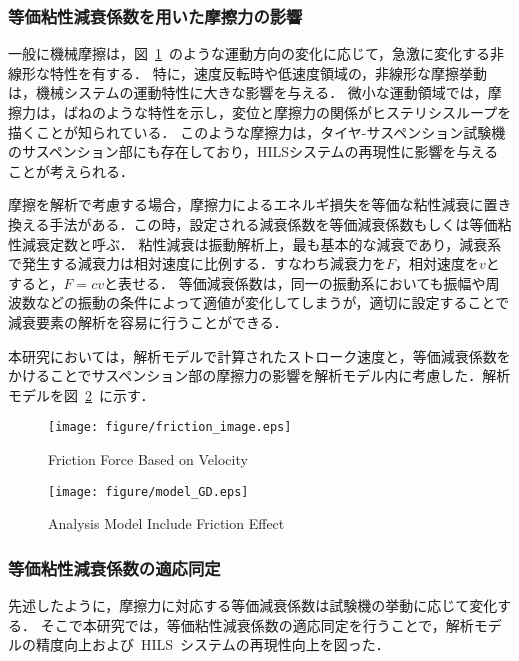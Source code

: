 \documentclass[a4paper,12pt]{article_vdlab_sotsuron}
\begin{document}
\subsubsection{等価粘性減衰係数を用いた摩擦力の影響}
一般に機械摩擦は，図~\ref{fig:Fric}~のような運動方向の変化に応じて，急激に変化する非線形な特性を有する．
特に，速度反転時や低速度領域の，非線形な摩擦挙動は，機械システムの運動特性に大きな影響を与える．
微小な運動領域では，摩擦力は，ばねのような特性を示し，変位と摩擦力の関係がヒステリシスループを描くことが知られている\cite{hys1}．
このような摩擦力は，タイヤ-サスペンション試験機のサスペンション部にも存在しており，HILSシステムの再現性に影響を与えることが考えられる．
\par
摩擦を解析で考慮する場合，摩擦力によるエネルギ損失を等価な粘性減衰に置き換える手法がある．この時，設定される減衰係数を等価減衰係数もしくは等価粘性減衰定数と呼ぶ．
粘性減衰は振動解析上，最も基本的な減衰であり，減衰系で発生する減衰力は相対速度に比例する．すなわち減衰力を$F$，相対速度を$v$とすると，$F=cv$と表せる．
等価減衰係数は，同一の振動系においても振幅や周波数などの振動の条件によって適値が変化してしまうが，適切に設定することで減衰要素の解析を容易に行うことができる．

本研究においては，解析モデルで計算されたストローク速度と，等価減衰係数をかけることでサスペンション部の摩擦力の影響を解析モデル内に考慮した．解析モデルを図~\ref{fig:model_GD}~に示す．

\vspace*{5mm}
\begin{figure}[h]
  \begin{center}
    \texttt{[image: figure/friction\_image.eps]}
    \vspace*{3mm}
    \caption{Friction Force Based on Velocity}
    \label{fig:Fric}
  \end{center}
\end{figure}
\begin{figure}[h]
  \begin{center}
    \texttt{[image: figure/model\_GD.eps]}
    \vspace*{3mm}
    \caption{Analysis Model Include Friction Effect}
    \label{fig:model_GD}
  \end{center}
\end{figure}
\newpage
\subsubsection{等価粘性減衰係数の適応同定}
先述したように，摩擦力に対応する等価減衰係数は試験機の挙動に応じて変化する．
そこで本研究では，等価粘性減衰係数の適応同定を行うことで，解析モデルの精度向上および~HILS~システムの再現性向上を図った．
\end{document}
